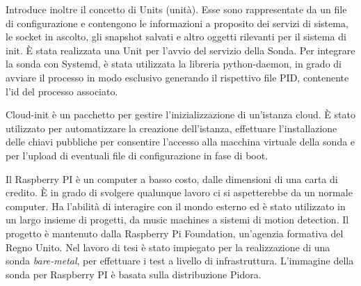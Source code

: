 \documentclass[../main.tex]{subfiles}
\begin{document}
\begin{description}[nolistsep]
Introduce inoltre il concetto di Units (unità). Esse sono rappresentate da un file di configurazione e contengono le informazioni a proposito dei servizi di sistema, le socket in ascolto, gli snapshot salvati e altro oggetti rilevanti per il sistema di init.
\newline
\`E stata realizzata una Unit per l'avvio del servizio della Sonda. Per integrare la sonda con Systemd, è stata utilizzata la libreria python-daemon, in grado di avviare il processo in modo esclusivo generando il rispettivo file PID, contenente l'id del processo associato.
\item[Cloud-init]
Cloud-init è un pacchetto per gestire l'inizializzazione di un'istanza cloud.
\newline
\`E stato utilizzato per automatizzare la creazione dell'istanza, effettuare l'installazione delle chiavi pubbliche per consentire l'accesso alla macchina virtuale della sonda e per l'upload di eventuali file di configurazione in fase di boot.
\item[Raspberry PI]
Il Raspberry PI è un computer a basso costo, dalle dimensioni di una carta di credito. \`E in grado di svolgere qualunque lavoro ci si aspetterebbe da un normale computer. Ha l'abilità di interagire con il mondo esterno ed è stato utilizzato in un largo insieme di progetti, da music machines a sistemi di motion detection.
Il progetto è mantenuto dalla Raspberry Pi Foundation, un'agenzia formativa del Regno Unito.
\newline
Nel lavoro di tesi è stato impiegato per la realizzazione di una sonda \textit{bare-metal}, per effettuare i test a livello di infrastruttura.
L'immagine della sonda per Raspberry PI è basata sulla distribuzione Pidora.
\end{description}
\end{document}
